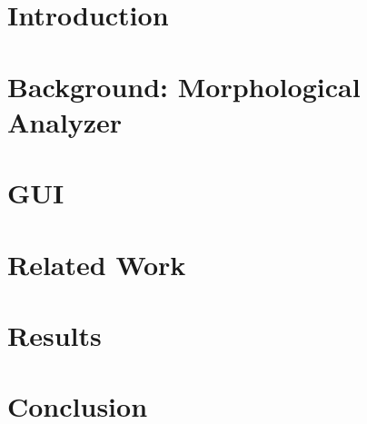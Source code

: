 

\section{Introduction}
\label{sec:introduction}


%

\section{Background: Morphological Analyzer}
\label{sec:morph}


\section{\framework}
\label{sec:framework}


\section{\framework GUI}
\label{sec:gui}


\section{Related Work}
\label{sec:related}


\section{Results}
\label{sec:results}


\section{Conclusion}
\label{sec:conclusion}



{\tiny }


